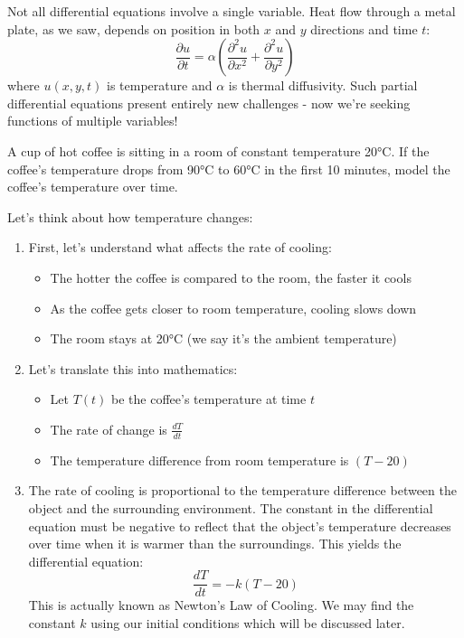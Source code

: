 \noindent Not all differential equations involve a single variable. Heat flow through a metal plate, as we saw, depends on position in both $x$ and $y$ directions and time $t$:
\[
\frac{\partial u}{\partial t} = \alpha\left(\frac{\partial^2 u}{\partial x^2} + \frac{\partial^2 u}{\partial y^2}\right)
\]
where $u(x,y,t)$ is temperature and $\alpha$ is thermal diffusivity. Such partial differential equations present entirely new challenges - now we're seeking functions of multiple variables! 

\exampleline
\begin{example}
A cup of hot coffee is sitting in a room of constant temperature 20°C. If the coffee's temperature drops from 90°C to 60°C in the first 10 minutes, model the coffee's temperature over time.
\begin{solution}
Let's think about how temperature changes:
\begin{enumerate}
\item First, let's understand what affects the rate of cooling:
\begin{itemize}
   \item The hotter the coffee is compared to the room, the faster it cools
   \item As the coffee gets closer to room temperature, cooling slows down
   \item The room stays at 20°C (we say it's the ambient temperature)
\end{itemize}
\item Let's translate this into mathematics:
\begin{itemize}
   \item Let $T(t)$ be the coffee's temperature at time $t$
   \item The rate of change is $\frac{dT}{dt}$
   \item The temperature difference from room temperature is $(T - 20)$
\end{itemize}
\item The rate of cooling is proportional to the temperature difference between the object and the surrounding environment. The constant in the differential equation must be negative to reflect that the object's temperature decreases over time when it is warmer than the surroundings. This yields the differential equation:
\[
\frac{dT}{dt} = -k(T - 20)
\]
\noindent This is actually known as Newton's Law of Cooling. We may find the constant $k$ using our initial conditions which will be discussed later.
\end{enumerate}

\end{solution}
\end{example}
\exampleline

